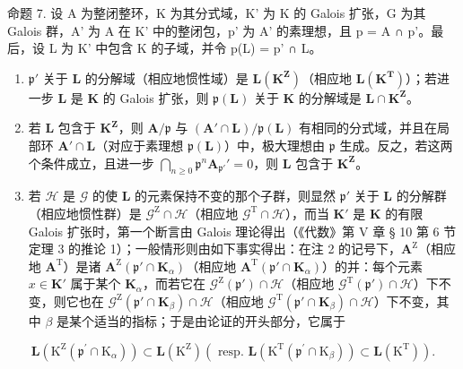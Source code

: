 命题 7. 设 A 为整闭整环，K 为其分式域，K' 为 K 的 Galois 扩张，G 为其 Galois 群，A' 为 A 在 K' 中的整闭包，p' 为 A' 的素理想，且 p = A ∩ p'。最后，设 L 为 K' 中包含 K 的子域，并令 p(L) = p' ∩ L。

\begin{enumerate}
\def\labelenumi{(\roman{enumi})}
\item
  \(\mathfrak{p}'\) 关于 \(\mathbf{L}\) 的分解域（相应地惯性域）是 \(\mathbf{L}(\mathbf{K}^{\mathbf{Z}})\)（相应地 \(\mathbf{L}(\mathbf{K}^{\mathbf{T}})\)）；若进一步 \(\mathbf{L}\) 是 \(\mathbf{K}\) 的 Galois 扩张，则 \(\mathfrak{p}(\mathbf{L})\) 关于 \(\mathbf{K}\) 的分解域是 \(\mathbf{L} \cap \mathbf{K}^{\mathbf{Z}}\)。
\item
  若 \(\mathbf{L}\) 包含于 \(\mathbf{K}^{\mathbf{Z}}\)，则 \(\mathbf{A} / \mathfrak{p}\) 与 \((\mathbf{A}' \cap \mathbf{L}) / \mathfrak{p}(\mathbf{L})\) 有相同的分式域，并且在局部环 \(\mathbf{A}' \cap \mathbf{L}\)（对应于素理想 \(\mathfrak{p}(\mathbf{L})\)）中，极大理想由 \(\mathfrak{p}\) 生成。反之，若这两个条件成立，且进一步 \(\bigcap_{n \geqslant 0} \mathfrak{p}^{n} \mathbf{A}_{\mathfrak{p}'}' = 0\)，则 \(\mathbf{L}\) 包含于 \(\mathbf{K}^{\mathbf{Z}}\)。
\item
  若 \(\mathcal{H}\) 是 \(\mathcal{G}\) 的使 \(\mathbf{L}\) 的元素保持不变的那个子群，则显然 \(\mathfrak{p}'\) 关于 \(\mathbf{L}\) 的分解群（相应地惯性群）是 \(\mathcal{G}^{\mathrm{Z}}\cap \mathcal{H}\)（相应地 \(\mathcal{G}^{\mathrm{T}}\cap \mathcal{H}\)），而当 \(\mathbf{K}'\) 是 \(\mathbf{K}\) 的有限 Galois 扩张时，第一个断言由 Galois 理论得出（《代数》第 V 章 § 10 第 6 节定理 3 的推论 1）；一般情形则由如下事实得出：在注 2 的记号下，\(\mathbf{A}^{\mathrm{Z}}\)（相应地 \(\mathbf{A}^{\mathrm{T}}\)）是诸 \(\mathbf{A}^{\mathrm{Z}}(\mathfrak{p}'\cap \mathbf{K}_{\alpha})\)（相应地 \(\mathbf{A}^{\mathrm{T}}(\mathfrak{p}'\cap \mathbf{K}_{\alpha})\)）的并：每个元素 \(x\in \mathbf{K}'\) 属于某个 \(\mathbf{K}_{\alpha}\)，而若它在 \(\mathcal{G}^{\mathrm{Z}}(\mathfrak{p}')\cap \mathcal{H}\)（相应地 \(\mathcal{G}^{\mathrm{T}}(\mathfrak{p}')\cap \mathcal{H}\)）下不变，则它也在 \(\mathcal{G}^{\mathrm{Z}}(\mathfrak{p}'\cap \mathbf{K}_{\beta})\cap \mathcal{H}\)（相应地 \(\mathcal{G}^{\mathrm{T}}(\mathfrak{p}'\cap \mathbf{K}_{\beta})\cap \mathcal{H}\)）下不变，其中 \(\beta\) 是某个适当的指标；于是由论证的开头部分，它属于
\end{enumerate}

\[
\mathbf {L} \left(\mathrm{K} ^ {\mathrm{Z}} \left(\mathfrak {p} ^ {\prime} \cap \mathrm{K} _ {\alpha}\right)\right) \subset \mathbf {L} \left(\mathrm{K} ^ {\mathrm{Z}}\right) (\text { resp. } \mathbf {L} \left(\mathrm{K} ^ {\mathrm{T}} \left(\mathfrak {p} ^ {\prime} \cap \mathrm{K} _ {\beta}\right)\right) \subset \mathbf {L} \left(\mathrm{K} ^ {\mathrm{T}}\right)).
\]

